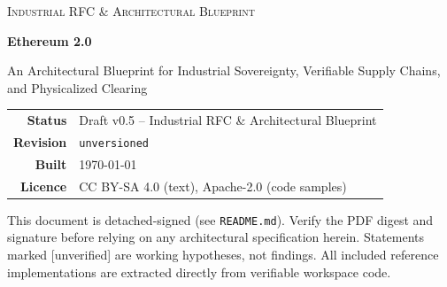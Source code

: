 \documentclass[a4paper,11pt,twoside,parskip=half-,headings=small]{scrartcl}
\newcommand{\bookletsubtitle}{Industrial RFC \& Architectural Blueprint}
\newcommand{\bookletcommit}{unversioned}%
\newcommand{\bookletdate}{\today}}
\newcommand{\code}[1]{\texttt{#1}}
\newcommand{\claim}[1]{\textcolor{warn}{[#1]}}
\begin{document}
\begin{titlepage}
  \centering
  \vspace*{1.8cm}
  {\color{mute}\scshape\large \bookletsubtitle\par}
  \vspace{0.6cm}
  {\color{ink}\Huge\bfseries Ethereum 2.0\par}
  \vspace{0.4cm}
  
  \vspace{0.8cm}
  {\large An Architectural Blueprint for Industrial Sovereignty, Verifiable Supply Chains, and Physicalized Clearing\par}
  \vfill
  \begin{tabular}{rl}
    \textbf{Status}   & Draft v0.5 -- \bookletsubtitle\\
    \textbf{Revision} & \code{\bookletcommit}\\
    \textbf{Built}    & \bookletdate\\
    \textbf{Licence}  & CC BY-SA 4.0 (text), Apache-2.0 (code samples)\\
  \end{tabular}
\vspace{1.0cm}

  \begin{minipage}{0.84\textwidth}\small\color{mute}
This document is detached-signed (see \code{README.md}). Verify the PDF
digest and signature before relying on any architectural specification herein.
Statements marked \claim{unverified} are working hypotheses, not findings.
All included reference implementations are extracted directly from verifiable workspace code.
  \end{minipage}
\vspace*{1.2cm}
\end{titlepage}
\end{document}

